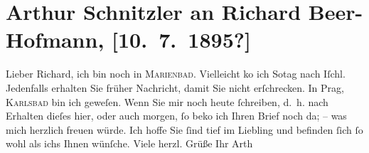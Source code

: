 

         
         \newcommand{\erwaehntePersonen}{Personen: Richard Beer-Hofmann}
         \newcommand{\erwaehnteInstitutionen}{}
         \newcommand{\erwaehnteOrte}{Orte: Bad Ischl, Karlsbad, Marienbad, Prag}
         \newcommand{\erwaehnteWerke}{Werke: Der Tod Georgs}
               \section[Arthur Schnitzler an Richard Beer-Hofmann, {[}10. 7. 1895?{]}]{ Arthur Schnitzler an Richard Beer-Hofmann, {[}10. 7. 1895?{]}}\nopagebreak{}\rehead{ }\begin{ledgroupsized}[t]{13cm}\normalsize\beginnumbering \toendnotes[C]{\smallbreak\pagebreak[2]} 
\pstart
           \noindent{}{\pb}Lieber Richard, ich bin noch in \textsc{Marienbad}. Vielleicht ko{\geminationm} ich So{\geminationn}tag nach Iſchl. Jedenfalls erhalten Sie früher Nachricht, damit Sie nicht
               erſchrecken. In Prag, \textsc{Karlsbad} bin ich geweſen. Wenn Sie mir {\pb}noch heute
               ſchreiben, d. h. nach Erhalten dieſes hier, oder auch morgen, ſo beko{\geminationm} ich Ihren Brief noch da; – was mich herzlich freuen
               würde. Ich hoffe Sie ſind tief im Liebling und
               befinden ſich ſo wohl als ichs Ihnen wünſche.\pend
           \pstart Viele herzl. Grüße Ihr \spacefill\mbox{Arth}\pend{}
         
         \endnumbering{}\end{ledgroupsized}  \newcommand{\dateiname}{L00461}\newcommand{\titel}{Arthur Schnitzler an Richard Beer-Hofmann, [10. 7. 1895?]}\newcommand{\editorInnen}{Martin Anton Müller und Gerd-Hermann Susen}
      